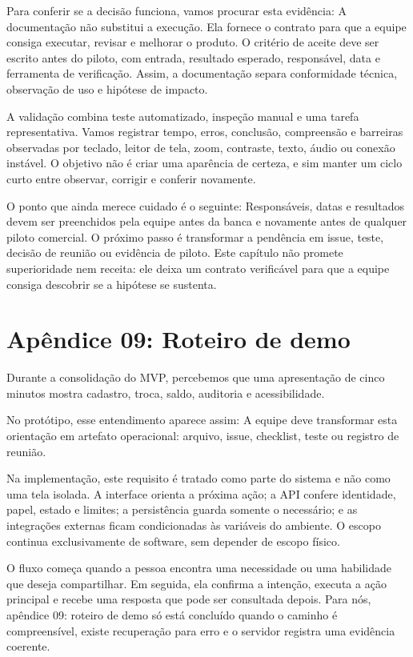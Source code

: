 \documentclass[12pt,oneside,a4paper,article]{abntex2}
\begin{document}
Para conferir se a decisão funciona, vamos procurar esta evidência: A documentação não substitui a execução. Ela fornece o contrato para que a equipe consiga executar, revisar e melhorar o produto. O critério de aceite deve ser escrito antes do piloto, com entrada, resultado esperado, responsável, data e ferramenta de verificação. Assim, a documentação separa conformidade técnica, observação de uso e hipótese de impacto.

A validação combina teste automatizado, inspeção manual e uma tarefa representativa. Vamos registrar tempo, erros, conclusão, compreensão e barreiras observadas por teclado, leitor de tela, zoom, contraste, texto, áudio ou conexão instável. O objetivo não é criar uma aparência de certeza, e sim manter um ciclo curto entre observar, corrigir e conferir novamente.

O ponto que ainda merece cuidado é o seguinte: Responsáveis, datas e resultados devem ser preenchidos pela equipe antes da banca e novamente antes de qualquer piloto comercial. O próximo passo é transformar a pendência em issue, teste, decisão de reunião ou evidência de piloto. Este capítulo não promete superioridade nem receita: ele deixa um contrato verificável para que a equipe consiga descobrir se a hipótese se sustenta.

\section{Apêndice 09: Roteiro de demo}
Durante a consolidação do MVP, percebemos que uma apresentação de cinco minutos mostra cadastro, troca, saldo, auditoria e acessibilidade.

No protótipo, esse entendimento aparece assim: A equipe deve transformar esta orientação em artefato operacional: arquivo, issue, checklist, teste ou registro de reunião.

Na implementação, este requisito é tratado como parte do sistema e não como uma tela isolada. A interface orienta a próxima ação; a API confere identidade, papel, estado e limites; a persistência guarda somente o necessário; e as integrações externas ficam condicionadas às variáveis do ambiente. O escopo continua exclusivamente de software, sem depender de escopo físico.

O fluxo começa quando a pessoa encontra uma necessidade ou uma habilidade que deseja compartilhar. Em seguida, ela confirma a intenção, executa a ação principal e recebe uma resposta que pode ser consultada depois. Para nós, apêndice 09: roteiro de demo só está concluído quando o caminho é compreensível, existe recuperação para erro e o servidor registra uma evidência coerente.
\end{document}
